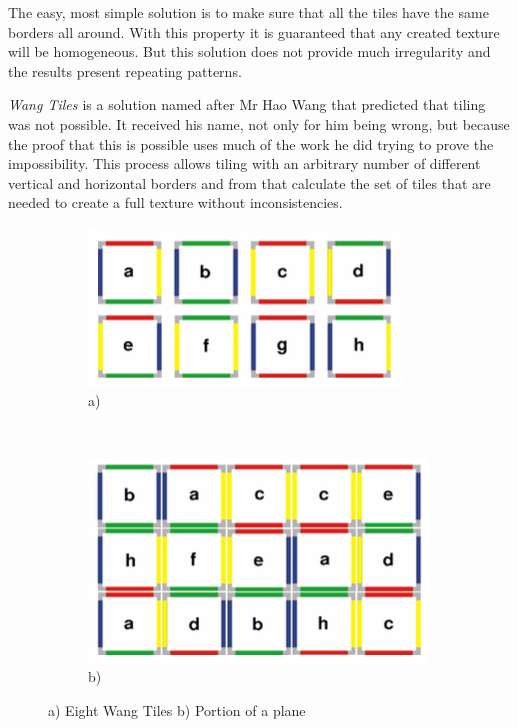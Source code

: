 The easy, most simple solution is to make sure that all the tiles have the same borders all around. With this property it is guaranteed that any created texture will be homogeneous. But this solution does not provide much irregularity and the results present repeating patterns. 



\emph{Wang Tiles \cite{Cohen2003}} is a solution named after Mr Hao Wang that predicted that tiling was not possible. It received his name, not only for him being wrong, but because the proof that this is possible uses much of the work he did trying to prove the impossibility. This process allows tiling with an arbitrary number of different vertical and horizontal borders and from that calculate the set of tiles that are needed to create a full texture without inconsistencies. 



\begin{figure}
        \centering
		\begin{subfigure}[b]{0.4\textwidth}
			\includegraphics[width=\textwidth]{img/Theory/Tiling/tiles.png}
			\caption{a)}
			\label{fig:TTileSet}
		\end{subfigure}
        ~ ~%
		\begin{subfigure}[b]{0.4\textwidth}
			\includegraphics[width=\textwidth]{img/Theory/Tiling/plane.png}
			\caption{b)}
			\label{fig:TPlanePortion}
		\end{subfigure}
        \caption{a) Eight Wang Tiles b) Portion of a plane}
        \label{fig:WangTiles}
\end{figure}


